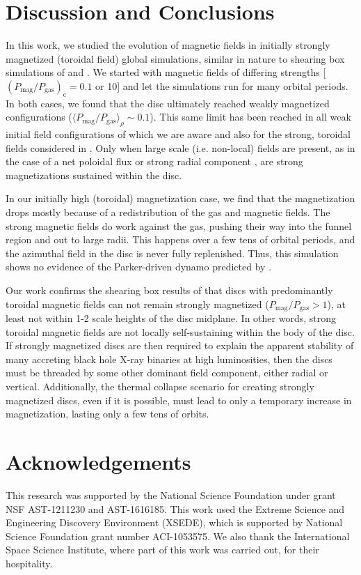 \documentclass[useAMS,usenatbib]{mn2e}
\def\pmpg{P_\mathrm{mag}/P_\mathrm{gas}}
\begin{document}
\section{Discussion and Conclusions}
\label{s.discuss}

In this work, we studied the evolution of magnetic fields in initially strongly magnetized (toroidal field) global simulations, similar in nature to shearing box simulations of \citet{Johansen08} and \citet{Salvesen16}.  We started with magnetic fields of differing strengths [$(\pmpg)_\mathrm{c} = 0.1$ or 10] and let the simulations run for many orbital periods.  In both cases, we found that the disc ultimately reached weakly magnetized configurations ($\langle \pmpg \rangle_\rho \sim 0.1$).  This same limit has been reached in all weak initial field configurations of which we are aware \citep[see][and references therein]{Hawley11,Hawley13} and also for the strong, toroidal fields considered in \citet{Salvesen16}.  Only when large scale (i.e. non-local) fields are present, as in the case of a net poloidal flux \citep{Bai13,Salvesen16a} or strong radial component \citep{Sadowski16}, are strong magnetizations sustained within the disc.  

In our initially high (toroidal) magnetization case, we find that the magnetization drops mostly because of a redistribution of the gas and magnetic fields.  The strong magnetic fields do work against the gas, pushing their way into the funnel region and out to large radii. This happens over a few tens of orbital periods, and the azimuthal field in the disc is never fully replenished.  Thus, this simulation shows no evidence of the Parker-driven dynamo predicted by \citet{Johansen08}.

Our work confirms the shearing box results of \citet{Salvesen16} that discs with predominantly toroidal magnetic fields can not remain strongly magnetized ($\pmpg > 1$), at least not within 1-2 scale heights of the disc midplane.  In other words, strong toroidal magnetic fields are not locally self-sustaining within the body of the disc.  If strongly magnetized discs are then required to explain the apparent stability of many accreting black hole X-ray binaries at high luminosities, then the discs must be threaded by some other dominant field component, either radial or vertical.  Additionally, the thermal collapse scenario for creating strongly magnetized discs, even if it is possible, must lead to only a temporary increase in magnetization, lasting only a few tens of orbits.

 
\section{Acknowledgements}

This research was supported by the National Science Foundation under grant NSF AST-1211230 and AST-1616185.  This work used the Extreme Science and Engineering Discovery Environment (XSEDE), which is supported by National Science Foundation grant number ACI-1053575.  We also thank the International Space Science Institute, where part of this work was carried out, for their hospitality.

 

%
\end{document}
